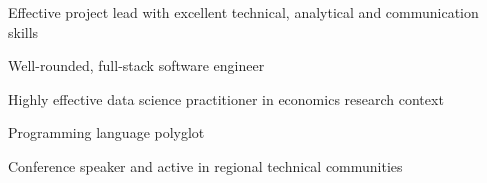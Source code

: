 

\begin{cvparagraph}

      \begin{cvitems}
        \item Effective project lead with excellent technical, analytical and communication skills
        \item Well-rounded, full-stack software engineer
        \item Highly effective data science practitioner in economics research context
        \item Programming language polyglot
        \item Conference speaker and active in regional technical communities
      \end{cvitems}

\end{cvparagraph}

